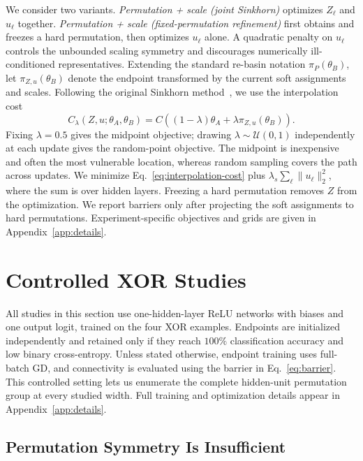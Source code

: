 \documentclass[twoside]{article}
\begin{document}
We consider two variants.  \emph{Permutation + scale (joint Sinkhorn)}
optimizes $Z_\ell$ and $u_\ell$ together.  \emph{Permutation + scale
(fixed-permutation refinement)} first obtains and freezes a hard permutation,
then optimizes $u_\ell$ alone.  A quadratic penalty on $u_\ell$ controls the unbounded
scaling symmetry and discourages numerically ill-conditioned representatives.
Extending the standard re-basin notation $\pi_P(\theta_B)$, let
$\pi_{Z,u}(\theta_B)$ denote the endpoint transformed by the current soft
assignments and scales.  Following the original Sinkhorn
method~\citep{guerrero2023rebasin}, we use the interpolation cost
\begin{equation}
 C_\lambda(Z,u;\theta_A,\theta_B)
 =C\!\left((1-\lambda)\theta_A
 +\lambda\pi_{Z,u}(\theta_B)\right).
\label{eq:interpolation-cost}
\end{equation}
Fixing $\lambda=0.5$ gives the midpoint objective; drawing
$\lambda\sim\mathcal{U}(0,1)$ independently at each update gives the random-point
objective.  The midpoint is inexpensive and often the most vulnerable
location, whereas random sampling covers the path across updates.  We minimize
Eq.~\ref{eq:interpolation-cost} plus
$\lambda_s\sum_\ell\lVert u_\ell\rVert_2^2$, where the sum is over hidden
layers.  Freezing a hard permutation removes $Z$ from the optimization.  We
report barriers only after projecting the soft assignments to hard
permutations.  Experiment-specific objectives and grids are given in
Appendix~\ref{app:details}.

\section{Controlled XOR Studies}
\label{sec:xor}

All studies in this section use one-hidden-layer ReLU networks with biases and
one output logit, trained on the four XOR examples.  Endpoints are initialized
independently and retained only if they reach $100\%$ classification accuracy
and low binary cross-entropy.  Unless stated otherwise, endpoint training uses
full-batch GD, and connectivity is evaluated using the barrier in
Eq.~\ref{eq:barrier}.  This controlled setting lets us enumerate the complete
hidden-unit permutation group at every studied width.  Full training and
optimization details appear in Appendix~\ref{app:details}.

\subsection{Permutation Symmetry Is Insufficient}
\end{document}
